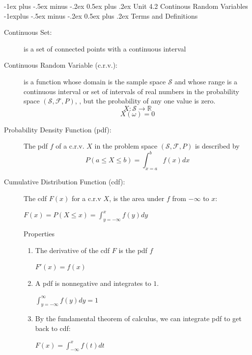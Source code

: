 \documentclass[10pt,landscape]{article}
\makeatletter
\renewcommand{\section}{\@startsection{section}{1}{0mm}%
                                {-1ex plus -.5ex minus -.2ex}%
                                {0.5ex plus .2ex}%
                                {\normalfont\large\bfseries}}
\renewcommand{\subsection}{\@startsection{subsection}{2}{0mm}%
                                {-1explus -.5ex minus -.2ex}%
                                {0.5ex plus .2ex}%
                                {\normalfont\normalsize\bfseries}}
\makeatother
\begin{document}
\begin{multicols}{3}
\section{Unit 4.2 Continous Random Variables}
	\subsection{Terms and Definitions}
\begin{description}
	\item[Continuous Set:] is a set of connected points with a continuous interval
	\item[Continuous Random Variable (c.r.v.):] is a function whose domain is the sample space $\mathscr{S}$ and whose range is a continuous interval or set of intervals of real numbers in the probability space $(\mathscr{S}, \mathscr{F}, P)$, , but the probability of any one value is zero.
      \[X:\mathscr{S} \rightarrow \mathbb{R}\]
      \[X(\omega) = 0\]
	\item[Probability Density Function (pdf):] The pdf $f$ of a c.r.v. $X$ in the problem space $(\mathscr{S}, \mathscr{F}, P)$ is described by 
    \[P(a \leq X \leq b) = \int_{x=a}^b{f(x)dx}\]
	\item[Cumulative Distribution Function (cdf):] The cdf $F(x)$ for a c.r.v $X$, is the area under $f$ from $-\infty$ to $x$:
	\begin{center}
	$F(x)=P(X \leq x) = \int_{y=-\infty}^x{f(y)dy}$
	\end{center}
Properties
    \begin{enumerate}
    \item The derivative of the cdf $F$ is the pdf $f$
    \begin{center}
    $F'(x) = f(x)$
    \end{center}
    \item A pdf is nonnegative and integrates to $1$. 
    \begin{center}
    $\int_{y=-\infty}^\infty{f(y)dy} = 1$
    \end{center}
    \item By the fundamental theorem of calculus, we can integrate pdf to get back to cdf:
    \begin{center} 
        $F(x) =\int_{-\infty}^x f(t)dt$
       \end{center}
       \begin{minipage}{\linewidth}

\end{minipage}
\end{enumerate}
\end{description}
\end{multicols}
\end{document}

